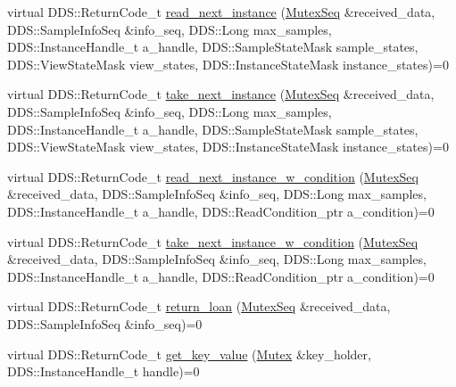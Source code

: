 \begin{DoxyCompactItemize}
\item 
virtual DDS::ReturnCode\_\-t \hyperlink{classKnowledge_1_1MutexDataReader_a0f1ec5fa19ce1d2e870da86cd4328142}{read\_\-next\_\-instance} (\hyperlink{namespaceKnowledge_a3165529aa87299c6a92754fbd7eeeff4}{MutexSeq} \&received\_\-data, DDS::SampleInfoSeq \&info\_\-seq, DDS::Long max\_\-samples, DDS::InstanceHandle\_\-t a\_\-handle, DDS::SampleStateMask sample\_\-states, DDS::ViewStateMask view\_\-states, DDS::InstanceStateMask instance\_\-states)=0
\item 
virtual DDS::ReturnCode\_\-t \hyperlink{classKnowledge_1_1MutexDataReader_a912f721527051a6b52c8db5a04c73390}{take\_\-next\_\-instance} (\hyperlink{namespaceKnowledge_a3165529aa87299c6a92754fbd7eeeff4}{MutexSeq} \&received\_\-data, DDS::SampleInfoSeq \&info\_\-seq, DDS::Long max\_\-samples, DDS::InstanceHandle\_\-t a\_\-handle, DDS::SampleStateMask sample\_\-states, DDS::ViewStateMask view\_\-states, DDS::InstanceStateMask instance\_\-states)=0
\item 
virtual DDS::ReturnCode\_\-t \hyperlink{classKnowledge_1_1MutexDataReader_a91ac56526614c363705641d43ec41ce0}{read\_\-next\_\-instance\_\-w\_\-condition} (\hyperlink{namespaceKnowledge_a3165529aa87299c6a92754fbd7eeeff4}{MutexSeq} \&received\_\-data, DDS::SampleInfoSeq \&info\_\-seq, DDS::Long max\_\-samples, DDS::InstanceHandle\_\-t a\_\-handle, DDS::ReadCondition\_\-ptr a\_\-condition)=0
\item 
virtual DDS::ReturnCode\_\-t \hyperlink{classKnowledge_1_1MutexDataReader_a792452aed491d03693de6cf05fb2b8a4}{take\_\-next\_\-instance\_\-w\_\-condition} (\hyperlink{namespaceKnowledge_a3165529aa87299c6a92754fbd7eeeff4}{MutexSeq} \&received\_\-data, DDS::SampleInfoSeq \&info\_\-seq, DDS::Long max\_\-samples, DDS::InstanceHandle\_\-t a\_\-handle, DDS::ReadCondition\_\-ptr a\_\-condition)=0
\item 
virtual DDS::ReturnCode\_\-t \hyperlink{classKnowledge_1_1MutexDataReader_ac0617c4f7a2900b94467aceba86506b7}{return\_\-loan} (\hyperlink{namespaceKnowledge_a3165529aa87299c6a92754fbd7eeeff4}{MutexSeq} \&received\_\-data, DDS::SampleInfoSeq \&info\_\-seq)=0
\item 
virtual DDS::ReturnCode\_\-t \hyperlink{classKnowledge_1_1MutexDataReader_a31f04584b9848d0d8590689274a42a51}{get\_\-key\_\-value} (\hyperlink{structKnowledge_1_1Mutex}{Mutex} \&key\_\-holder, DDS::InstanceHandle\_\-t handle)=0
\end{DoxyCompactItemize}
